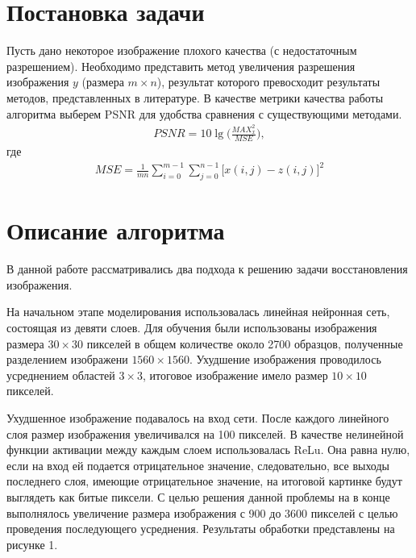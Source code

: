 \documentclass[12pt,twoside]{article}
\begin{document}
\section{Постановка задачи}
	Пусть дано некоторое изображение плохого качества (с недостаточным разрешением). Необходимо представить метод увеличения разрешения изображения $y$ (размера $m\times n$), результат которого превосходит результаты методов, представленных в литературе. В качестве метрики качества работы алгоритма выберем PSNR для удобства сравнения с существующими методами. 
	\begin{gather}
		PSNR = 10\lg\bigg(\frac{MAX_x^2}{MSE} \bigg),
	\end{gather}
	где
	\begin{gather}
		MSE = \frac{1}{mn}\sum_{i=0}^{m-1}\sum_{j=0}^{n-1}\big[x(i,j)-z(i,j)\big]^2
	\end{gather}
	
\section{Описание алгоритма}

	В данной работе рассматривались два подхода к решению задачи восстановления изображения. 

	На начальном этапе моделирования использовалась линейная нейронная сеть, состоящая из девяти слоев. Для обучения были использованы изображения размера $30 \times 30$ пикселей в общем количестве около 2700 образцов, полученные разделением изображени $1560 \times 1560$. Ухудшение изображения проводилось усреднением областей $3 \times 3$, итоговое изображение имело размер $10 \times 10$ пикселей.
	
	Ухудшенное изображение подавалось на вход сети. После каждого линейного слоя размер изображения увеличивался на 100 пикселей. В качестве нелинейной функции активации между каждым слоем использовалась ReLu. Она равна нулю, если на вход ей подается отрицательное значение, следовательно, все выходы последнего слоя, имеющие отрицательное значение, на итоговой картинке будут выглядеть как битые пиксели. С целью решения данной проблемы на в конце выполнялось увеличение размера изображения с 900 до 3600 пикселей с целью проведения последующего усреднения. Результаты обработки представлены на рисунке 1.
\end{document}
